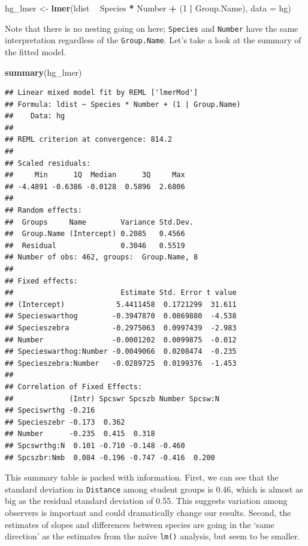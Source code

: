\documentclass[]{book}
\newenvironment{Shaded}{\begin{snugshade}}{\end{snugshade}}
\newcommand{\KeywordTok}[1]{\textcolor[rgb]{0.13,0.29,0.53}{\textbf{#1}}}
\newcommand{\DataTypeTok}[1]{\textcolor[rgb]{0.13,0.29,0.53}{#1}}
\newcommand{\DecValTok}[1]{\textcolor[rgb]{0.00,0.00,0.81}{#1}}
\newcommand{\StringTok}[1]{\textcolor[rgb]{0.31,0.60,0.02}{#1}}
\newcommand{\OperatorTok}[1]{\textcolor[rgb]{0.81,0.36,0.00}{\textbf{#1}}}
\newcommand{\NormalTok}[1]{#1}
\theoremstyle{definition}
\theoremstyle{definition}
\theoremstyle{definition}
\theoremstyle{remark}
\begin{document}
\begin{Shaded}
\begin{Highlighting}[]
\NormalTok{hg_lmer <-}\StringTok{ }\KeywordTok{lmer}\NormalTok{(ldist }\OperatorTok{~}\StringTok{ }\NormalTok{Species }\OperatorTok{*}\StringTok{ }\NormalTok{Number }\OperatorTok{+}\StringTok{ }\NormalTok{(}\DecValTok{1} \OperatorTok{|}\StringTok{ }\NormalTok{Group.Name), }\DataTypeTok{data =}\NormalTok{ hg)}
\end{Highlighting}
\end{Shaded}

Note that there is no nesting going on here; \texttt{Species} and
\texttt{Number} have the same interpretation regardless of the
\texttt{Group.Name}. Let's take a look at the summary of the fitted
model.

\begin{Shaded}
\begin{Highlighting}[]
\KeywordTok{summary}\NormalTok{(hg_lmer)}
\end{Highlighting}
\end{Shaded}

\begin{verbatim}
## Linear mixed model fit by REML ['lmerMod']
## Formula: ldist ~ Species * Number + (1 | Group.Name)
##    Data: hg
## 
## REML criterion at convergence: 814.2
## 
## Scaled residuals: 
##     Min      1Q  Median      3Q     Max 
## -4.4891 -0.6386 -0.0128  0.5896  2.6806 
## 
## Random effects:
##  Groups     Name        Variance Std.Dev.
##  Group.Name (Intercept) 0.2085   0.4566  
##  Residual               0.3046   0.5519  
## Number of obs: 462, groups:  Group.Name, 8
## 
## Fixed effects:
##                         Estimate Std. Error t value
## (Intercept)            5.4411458  0.1721299  31.611
## Specieswarthog        -0.3947870  0.0869880  -4.538
## Specieszebra          -0.2975063  0.0997439  -2.983
## Number                -0.0001202  0.0099875  -0.012
## Specieswarthog:Number -0.0049066  0.0208474  -0.235
## Specieszebra:Number   -0.0289725  0.0199376  -1.453
## 
## Correlation of Fixed Effects:
##             (Intr) Spcswr Spcszb Number Spcsw:N
## Speciswrthg -0.216                             
## Specieszebr -0.173  0.362                      
## Number      -0.235  0.415  0.318               
## Spcswrthg:N  0.101 -0.710 -0.148 -0.460        
## Spcszbr:Nmb  0.084 -0.196 -0.747 -0.416  0.200
\end{verbatim}

This summary table is packed with information. First, we can see that
the standard deviation in \texttt{Distance} among student groups is
0.46, which is almost as big as the residual standard deviation of 0.55.
This suggests variation among observers is important and could
dramatically change our results. Second, the estimates of slopes and
differences between species are going in the `same direction' as the
estimates from the naïve \texttt{lm()} analysis, but seem to be smaller.
\end{document}
